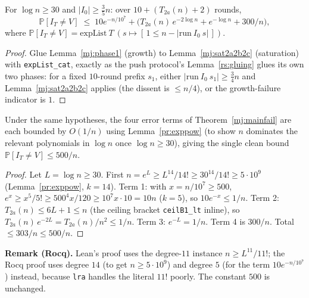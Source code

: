 \begin{theorem}\label{mj:mainfail}
  \rocqok
  For $\log n\ge30$ and $|I_0|\ge\tfrac35n$: over $10+(T_{2a}(n)+2)$
  rounds,
  \[
    \mathbb{P}[I_T\ne V] \;\le\; 10e^{-n/10^7}
      + \bigl(T_{2a}(n)\,e^{-2\log n} + e^{-\log n} + 300/n\bigr),
  \]
  where $\mathbb{P}[I_T \ne V] = \mathrm{expList}\ T\ (s \mapsto
  [\,1 \le n - |\mathrm{run}\ I_0\ s|\,])$.
\end{theorem}
\begin{proof}
  \rocqok
  Glue Lemma~\ref{mj:phase1} (growth) to Lemma~\ref{mj:sat2a2b2c}
  (saturation) with \texttt{expList\_cat}, exactly as the push protocol's
  Lemma~\ref{rs:gluing} glues its own two phases: for a fixed
  $10$-round prefix $s_1$, either $|\mathrm{run}\ I_0\ s_1| \ge \tfrac34 n$
  and Lemma~\ref{mj:sat2a2b2c} applies (the dissent is $\le n/4$), or the
  growth-failure indicator is $1$.
\end{proof}

\begin{theorem}\label{mj:mainfailclean}
  \rocqok
  Under the same hypotheses, the four error terms of
  Theorem~\ref{mj:mainfail} are each bounded by $O(1/n)$ using
  Lemma~\ref{pr:exppow} (to show $n$ dominates the relevant polynomials in
  $\log n$ once $\log n\ge30$), giving the single clean bound
  $\mathbb{P}[I_T\ne V] \le 500/n$.
\end{theorem}
\begin{proof}
  \rocqok
  Let $L = \log n \ge 30$. First $n = e^L \ge L^{14}/14! \ge 30^{14}/14!
  \ge 5\cdot 10^9$ (Lemma~\ref{pr:exppow}, $k = 14$). Term 1: with
  $x = n/10^7 \ge 500$, $e^x \ge x^5/5! \ge 500^4 x / 120 \ge 10^7 x \cdot 10
  = 10 n$ ($k = 5$), so $10 e^{-x} \le 1/n$. Term 2:
  $T_{2a}(n) \le 6L + 1 \le n$ (the ceiling bracket \texttt{ceilB1\_lt}
  inline), so $T_{2a}(n)\, e^{-2L} = T_{2a}(n)/n^2 \le 1/n$. Term 3:
  $e^{-L} = 1/n$. Term 4 is $300/n$. Total $\le 303/n \le 500/n$.
\end{proof}

\noindent\textbf{Remark (Rocq).} Lean's proof uses the degree-$11$ instance
$n \ge L^{11}/11!$; the Rocq proof uses degree $14$ (to get
$n \ge 5\cdot 10^9$) and degree $5$ (for the term $10 e^{-n/10^7}$) instead,
because \texttt{lra} handles the literal $11!$ poorly. The constant $500$ is
unchanged.

